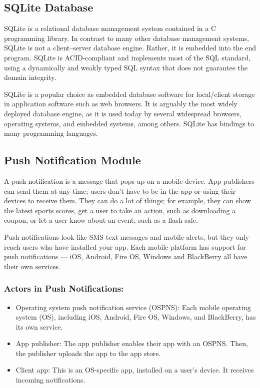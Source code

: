\subsection{SQLite Database}

SQLite is a relational database management system contained in a C programming library. In contrast to many other database management systems, SQLite is not a client–server database engine. Rather, it is embedded into the end program. SQLite is ACID-compliant and implements most of the SQL standard, using a dynamically and weakly typed SQL syntax that does not guarantee the domain integrity.

SQLite is a popular choice as embedded database software for local/client storage in application software such as web browsers. It is arguably the most widely deployed database engine, as it is used today by several widespread browsers, operating systems, and embedded systems, among others. SQLite has bindings to many programming languages.
\subsection{Push Notification Module}
A push notification is a message that pops up on a mobile device. App publishers can send them at any time; users don't have to be in the app or using their devices to receive them. They can do a lot of things; for example, they can show the latest sports scores, get a user to take an action, such as downloading a coupon, or let a user know about an event, such as a flash sale.

Push notifications look like SMS text messages and mobile alerts, but they only reach users who have installed your app. Each mobile platform has support for push notifications — iOS, Android, Fire OS, Windows and BlackBerry all have their own services.

\subsubsection{Actors in Push Notifications:}
\begin{itemize}

\item{Operating system push notification service (OSPNS): Each mobile operating system (OS), including iOS, Android, Fire OS, Windows, and BlackBerry, has its own service.}

\item{App publisher: The app publisher enables their app with an OSPNS. Then, the publisher uploads the app to the app store.}

\item{Client app: This is an OS-specific app, installed on a user's device. It receives incoming notifications.}

\end{itemize}

